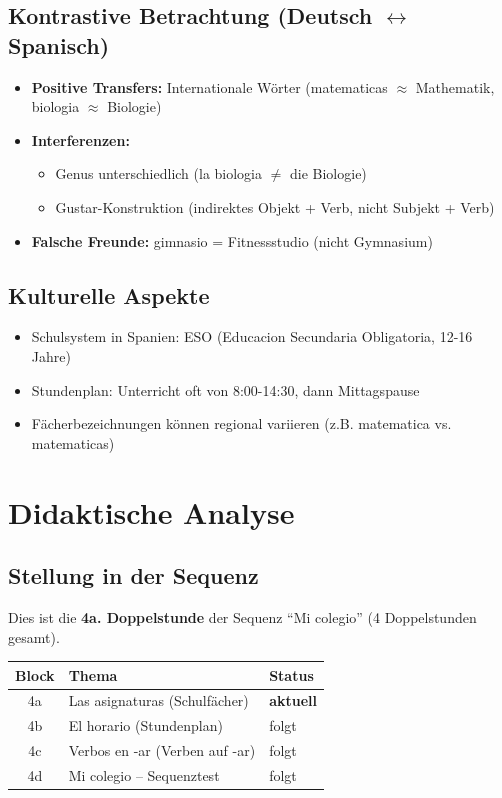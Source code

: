 \documentclass[11pt,a4paper]{article}
\newcommand{\reihenthema}{Mi colegio}
\newcommand{\stundennummer}{4a}
\newcommand{\reihenstunden}{4}
\begin{document}
\subsection{Kontrastive Betrachtung (Deutsch $\leftrightarrow$ Spanisch)}
\begin{itemize}
    \item \textbf{Positive Transfers:} Internationale Wörter (matematicas $\approx$ Mathematik, biologia $\approx$ Biologie)
    \item \textbf{Interferenzen:}
    \begin{itemize}
        \item Genus unterschiedlich (la biologia $\neq$ die Biologie)
        \item Gustar-Konstruktion (indirektes Objekt + Verb, nicht Subjekt + Verb)
    \end{itemize}
    \item \textbf{Falsche Freunde:} gimnasio = Fitnessstudio (nicht Gymnasium)
\end{itemize}

\subsection{Kulturelle Aspekte}
\begin{itemize}
    \item Schulsystem in Spanien: ESO (Educacion Secundaria Obligatoria, 12-16 Jahre)
    \item Stundenplan: Unterricht oft von 8:00-14:30, dann Mittagspause
    \item Fächerbezeichnungen können regional variieren (z.B. matematica vs. matematicas)
\end{itemize}

\section{Didaktische Analyse}

\subsection{Stellung in der Sequenz}
Dies ist die \textbf{\stundennummer. Doppelstunde} der Sequenz ``\reihenthema'' (\reihenstunden{} Doppelstunden gesamt).

\begin{tabular}{|c|l|l|}
\hline
\textbf{Block} & \textbf{Thema} & \textbf{Status} \\
\hline
4a & Las asignaturas (Schulfächer) & \textbf{aktuell} \\
4b & El horario (Stundenplan) & folgt \\
4c & Verbos en -ar (Verben auf -ar) & folgt \\
4d & Mi colegio -- Sequenztest & folgt \\
\hline
\end{tabular}
\end{document}
